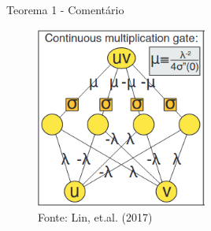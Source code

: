 \documentclass{beamer}
\begin{document}
\begin{frame}{Teorema 1 - Comentário}
    \begin{figure}
        \caption{Ilustração da arquitetura da rede no teorema anterior}
        \includegraphics[width=0.5\textwidth]{fig/productgate.png}
        \caption*{Fonte: Lin, et.al. (2017)}
    \end{figure}
\end{frame}
\end{document}
